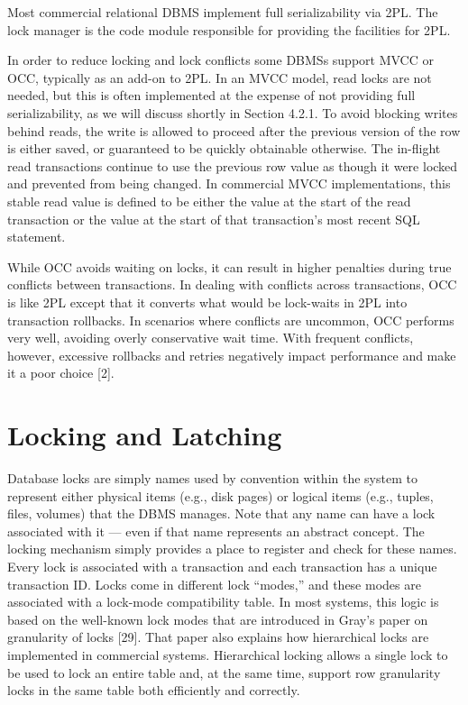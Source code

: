 \documentclass[a4paper,11pt,twoside,openright]{book}
\begin{document}
Most commercial relational DBMS implement full serializability via 2PL.
The lock manager is the code module responsible for providing the
facilities for 2PL.

In order to reduce locking and lock conflicts some DBMSs support MVCC
or OCC, typically as an add-on to 2PL. In an MVCC model, read locks are
not needed, but this is often implemented at the expense of not
providing full serializability, as we will discuss shortly in Section
4.2.1. To avoid blocking writes behind reads, the write is allowed to
proceed after the previous version of the row is either saved, or
guaranteed to be quickly obtainable otherwise. The in-flight read
transactions continue to use the previous row value as though it were
locked and prevented from being changed. In commercial MVCC
implementations, this stable read value is defined to be either the
value at the start of the read transaction or the value at the start of
that transaction's most recent SQL statement.

While OCC avoids waiting on locks, it can result in higher penalties
during true conflicts between transactions. In dealing with conflicts
across transactions, OCC is like 2PL except that it converts what would
be lock-waits in 2PL into transaction rollbacks. In scenarios where
conflicts are uncommon, OCC performs very well, avoiding overly
conservative wait time. With frequent conflicts, however, excessive
rollbacks and retries negatively impact performance and make it a poor
choice {[}2{]}.

\hypertarget{locking-and-latching}{%
\section{Locking and Latching}\label{locking-and-latching}}

Database locks are simply names used by convention within the system to
represent either physical items (e.g., disk pages) or logical items
(e.g., tuples, files, volumes) that the DBMS manages. Note that any name
can have a lock associated with it --- even if that name represents an
abstract concept. The locking mechanism simply provides a place to
register and check for these names. Every lock is associated with a
transaction and each transaction has a unique transaction ID. Locks come
in different lock ``modes,'' and these modes are associated with a
lock-mode compatibility table. In most systems, this logic is based on
the well-known lock modes that are introduced in Gray's paper on
granularity of locks {[}29{]}. That paper also explains how hierarchical
locks are implemented in commercial systems. Hierarchical locking allows
a single lock to be used to lock an entire table and, at the same time,
support row granularity locks in the same table both efficiently and
correctly.
\end{document}

